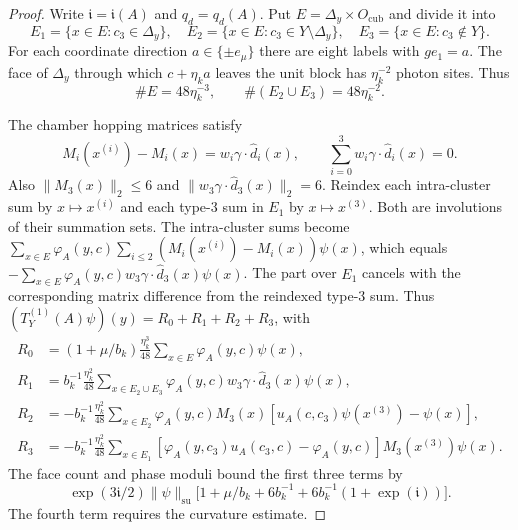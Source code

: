 \begin{proof}
Write $\mathfrak i=\mathfrak i(A)$ and $q_d=q_d(A)$.
Put $E=\Delta_y\times O_{\mathrm{cub}}$ and divide it into
\[
 E_1=\{x\in E:c_3\in\Delta_y\},\quad
 E_2=\{x\in E:c_3\in Y\setminus\Delta_y\},\quad
 E_3=\{x\in E:c_3\notin Y\}.
\]
For each coordinate direction $a\in\{\pm e_\mu\}$ there are
eight labels with $ge_1=a$. The face of $\Delta_y$ through
which $c+\eta_ka$ leaves the unit block has $\eta_k^{-2}$
photon sites. Thus
\begin{equation}\label{eq:rg-reconstruction-face-count}
 \#E=48\eta_k^{-3},\qquad \#(E_2\cup E_3)=48\eta_k^{-2}.
\end{equation}

The chamber hopping matrices satisfy
\[
 M_i(x^{(i)})-M_i(x)=w_i\gamma\cdot\widehat d_i(x),\qquad
 \sum_{i=0}^3w_i\gamma\cdot\widehat d_i(x)=0.
\]
Also $\|M_3(x)\|_2\le6$ and
$\|w_3\gamma\cdot\widehat d_3(x)\|_2=6$.
Reindex each intra-cluster sum by $x\mapsto x^{(i)}$ and
each type-$3$ sum in $E_1$ by $x\mapsto x^{(3)}$.
Both are involutions of their summation sets. The intra-cluster
sums become
$\sum_{x\in E}\varphi_A(y,c)\sum_{i\le2}
 (M_i(x^{(i)})-M_i(x))\psi(x)$, which equals
$-\sum_{x\in E}\varphi_A(y,c)w_3\gamma\cdot\widehat d_3(x)\psi(x)$.
The part over $E_1$ cancels with the corresponding matrix
difference from the reindexed type-$3$ sum. Thus
$(T_Y^{(1)}(A)\psi)(y)=R_0+R_1+R_2+R_3$, with
\begin{equation}\label{eq:rg-reconstruction-summation-parts}
 \begin{split}
 R_0&=(1+\mu/b_k)\frac{\eta_k^3}{48}
                         \sum_{x\in E}\varphi_A(y,c)\psi(x),\\
 R_1&=b_k^{-1}\frac{\eta_k^2}{48}
       \sum_{x\in E_2\cup E_3}
                     \varphi_A(y,c)w_3\gamma\cdot\widehat d_3(x)\psi(x),\\
 R_2&=-b_k^{-1}\frac{\eta_k^2}{48}\sum_{x\in E_2}
       \varphi_A(y,c)M_3(x)[u_A(c,c_3)\psi(x^{(3)})-\psi(x)],\\
 R_3&=-b_k^{-1}\frac{\eta_k^2}{48}\sum_{x\in E_1}
       [\varphi_A(y,c_3)u_A(c_3,c)-\varphi_A(y,c)]
                                             M_3(x^{(3)})\psi(x).
 \end{split}
\end{equation}
The face count and phase moduli bound the first three terms by
\[
 \exp(3\mathfrak i/2)\|\psi\|_{\mathrm{su}}
       \big[1+\mu/b_k+6b_k^{-1}
                           +6b_k^{-1}(1+\exp(\mathfrak i))\big].
\]
The fourth term requires the curvature estimate.


\end{proof}
